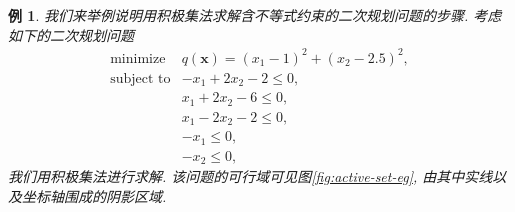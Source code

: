 \documentclass{SBCbookchapter}
\newcommand{\V}[1]{{\bm{#1}}}
\newtheorem{eg}[thm]{例}
\numberwithin{equation}{section}
\begin{document}
\begin{eg}
\label{eg:qp-active-set-algo}
我们来举例说明用积极集法求解含不等式约束的二次规划问题的步骤. 考虑如下的二次规划问题
\begin{equation*}
\begin{array}{cl}
\text{minimize} & q(\V{x}) = (x_1 - 1)^2 + (x_2 - 2.5)^2, \\
\text{subject to} & -x_1 + 2x_2 - 2 \leqslant 0, \\
& x_1 + 2x_2 - 6 \leqslant 0, \\
& x_1 - 2x_2 - 2 \leqslant 0, \\
& -x_1 \leqslant 0, \\
& -x_2 \leqslant 0,
\end{array}
\end{equation*}
我们用积极集法进行求解. 该问题的可行域可见图\ref{fig:active-set-eg}, 由其中实线以及坐标轴围成的阴影区域.




\end{eg}
\end{document}
